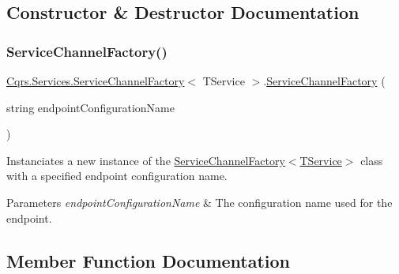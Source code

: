 \subsection{Constructor \& Destructor Documentation}
\mbox{\label{classCqrs_1_1Services_1_1ServiceChannelFactory_a8b483162bcc271fa8212c72e13e28f55}} 
\subsubsection{\texorpdfstring{Service\+Channel\+Factory()}{ServiceChannelFactory()}}
{\footnotesize\ttfamily \hyperlink{classCqrs_1_1Services_1_1ServiceChannelFactory}{Cqrs.\+Services.\+Service\+Channel\+Factory}$<$ T\+Service $>$.\hyperlink{classCqrs_1_1Services_1_1ServiceChannelFactory}{Service\+Channel\+Factory} (\begin{DoxyParamCaption}\item[{string}]{endpoint\+Configuration\+Name }\end{DoxyParamCaption})}



Instanciates a new instance of the \hyperlink{classCqrs_1_1Services_1_1ServiceChannelFactory_a8b483162bcc271fa8212c72e13e28f55}{Service\+Channel\+Factory$<$\+T\+Service$>$} class with a specified endpoint configuration name. 


\begin{DoxyParams}{Parameters}
{\em endpoint\+Configuration\+Name} & The configuration name used for the endpoint.\\
\hline
\end{DoxyParams}


\subsection{Member Function Documentation}
\mbox{\label{classCqrs_1_1Services_1_1ServiceChannelFactory_a90572d83f68b4ba72687bb8c755b0845}} 
